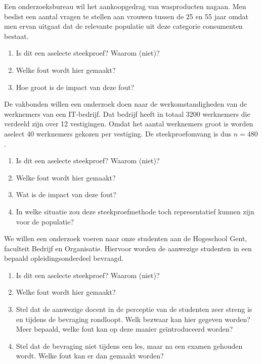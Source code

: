 \begin{exercise}
  Een onderzoeksbureau wil het aankoopgedrag van wasproducten nagaan. Men beslist een aantal vragen te stellen aan vrouwen tussen de 25 en 55 jaar omdat men ervan uitgaat dat de relevante populatie uit deze categorie consumenten bestaat.
  
  \begin{enumerate}[label=\alph*.]
    \item Is dit een aselecte steekproef? Waarom (niet)?
    \item Welke fout wordt hier gemaakt?
    \item Hoe groot is de impact van deze fout?
  \end{enumerate}
\end{exercise}

\begin{exercise}
  De vakbonden willen een onderzoek doen naar de werkomstandigheden van de werknemers van een IT-bedrijf. Dat bedrijf heeft in totaal 3200 werknemers die verdeeld zijn over 12 vestigingen. Omdat het aantal werknemers groot is worden aselect 40 werknemers gekozen per vestiging. De steekproefomvang is dus $n = 480$.
  
  \begin{enumerate}[label=\alph*.]
    \item Is dit een aselecte steekproef? Waarom (niet)?
    \item Welke fout wordt hier gemaakt?
    \item Wat is de impact van deze fout?
    \item In welke situatie zou deze steekproefmethode toch representatief kunnen zijn voor de populatie?
  \end{enumerate}
\end{exercise}

\begin{exercise}
  We willen een onderzoek voeren naar onze studenten aan de Hogeschool Gent, faculteit Bedrijf en Organisatie. Hiervoor worden de aanwezige studenten in een bepaald opleidingsonderdeel bevraagd.
  
  \begin{enumerate}[label=\alph*.]
    \item Is dit een aselecte steekproef? Waarom (niet)?
    \item Welke fout wordt hier gemaakt?
    \item Stel dat de aanwezige docent in de perceptie van de studenten zeer streng is en tijdens de bevraging rondloopt. Welk bezwaar kan hier gegeven worden? Meer bepaald, welke fout kan op deze manier ge\"introduceerd worden?
    \item Stel dat de bevraging niet tijdens een les, maar na een examen gehouden wordt. Welke fout kan er dan gemaakt worden?
  \end{enumerate}
\end{exercise}

